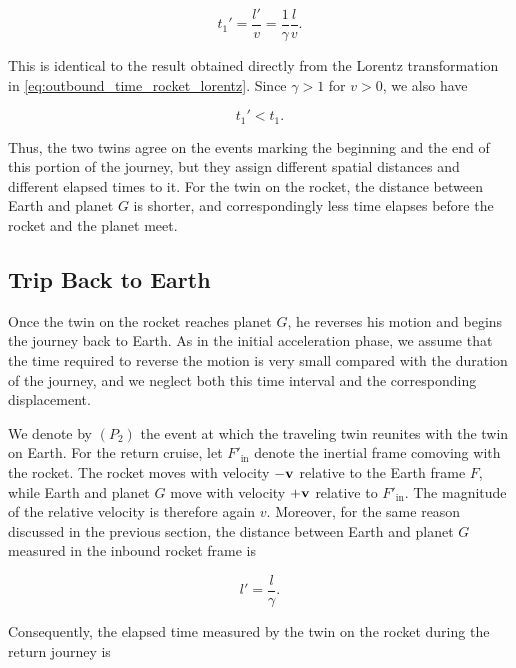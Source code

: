 \documentclass[12pt]{article}
\begin{document}
\begin{equation}
  t_1'
  =
  \frac{l'}{v}
  =
  \frac{1}{\gamma}\frac{l}{v}.
  \label{eq:outbound_time_rocket_length}
\end{equation}

This is identical to the result obtained directly from the Lorentz transformation in
\eqref{eq:outbound_time_rocket_lorentz}. Since $\gamma>1$ for $v>0$, we also have

\begin{equation}
  t_1'<t_1.
\end{equation}

Thus, the two twins agree on the events marking the beginning and the end of this
portion of the journey, but they assign different spatial distances and different
elapsed times to it. For the twin on the rocket, the distance between Earth and planet
$G$ is shorter, and correspondingly less time elapses before the rocket and the planet
meet.

 
\subsection{Trip Back to Earth}

Once the twin on the rocket reaches planet $G$, he reverses his motion and begins the
journey back to Earth. As in the initial acceleration phase, we assume that the time
required to reverse the motion is very small compared with the duration of the journey,
and we neglect both this time interval and the corresponding displacement. \par

We denote by $(P_2)$ the event at which the traveling twin reunites with the twin on Earth.
For the return cruise, let $F'_{\mathrm{in}}$ denote the inertial frame comoving with the
rocket. The rocket moves with velocity $-\vb v$ relative to the Earth frame $F$, while Earth
and planet $G$ move with velocity $+\vb v$ relative to $F'_{\mathrm{in}}$. The magnitude of
the relative velocity is therefore again $v$. Moreover, for the same reason discussed in
the previous section, the distance between Earth and planet $G$ measured in the inbound
rocket frame is

\[
  l'=\frac{l}{\gamma}.
\]

Consequently, the elapsed time measured by the twin on the rocket during the return
journey is
\end{document}
